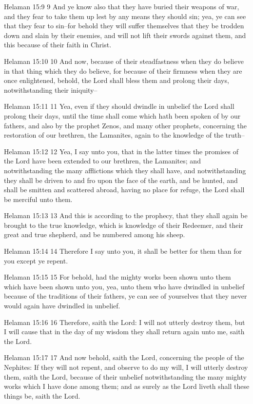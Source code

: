 Helaman 15:9
 9 And ye know also that they have buried their weapons of war,
and they fear to take them up lest by any means they should sin;
yea, ye can see that they fear to sin--for behold they will
suffer themselves that they be trodden down and slain by their
enemies, and will not lift their swords against them, and this
because of their faith in Christ.

Helaman 15:10
 10 And now, because of their steadfastness when they do believe
in that thing which they do believe, for because of their
firmness when they are once enlightened, behold, the Lord shall
bless them and prolong their days, notwithstanding their
iniquity--

Helaman 15:11
 11 Yea, even if they should dwindle in unbelief the Lord shall
prolong their days, until the time shall come which hath been
spoken of by our fathers, and also by the prophet Zenos, and many
other prophets, concerning the restoration of our brethren, the
Lamanites, again to the knowledge of the truth--

Helaman 15:12
 12 Yea, I say unto you, that in the latter times the promises of
the Lord have been extended to our brethren, the Lamanites; and
notwithstanding the many afflictions which they shall have, and
notwithstanding they shall be driven to and fro upon the face of
the earth, and be hunted, and shall be smitten and scattered
abroad, having no place for refuge, the Lord shall be merciful
unto them.

Helaman 15:13
 13 And this is according to the prophecy, that they shall again
be brought to the true knowledge, which is knowledge of their
Redeemer, and their great and true shepherd, and be numbered
among his sheep.

Helaman 15:14
 14 Therefore I say unto you, it shall be better for them than
for you except ye repent.

Helaman 15:15
 15 For behold, had the mighty works been shown unto them which
have been shown unto you, yea, unto them who have dwindled in
unbelief because of the traditions of their fathers, ye can see
of yourselves that they never would again have dwindled in
unbelief.

Helaman 15:16
 16 Therefore, saith the Lord: I will not utterly destroy them,
but I will cause that in the day of my wisdom they shall return
again unto me, saith the Lord.

Helaman 15:17
 17 And now behold, saith the Lord, concerning the people of the
Nephites: If they will not repent, and observe to do my will, I
will utterly destroy them, saith the Lord, because of their
unbelief notwithstanding the many mighty works which I have done
among them; and as surely as the Lord liveth shall these things
be, saith the Lord.

